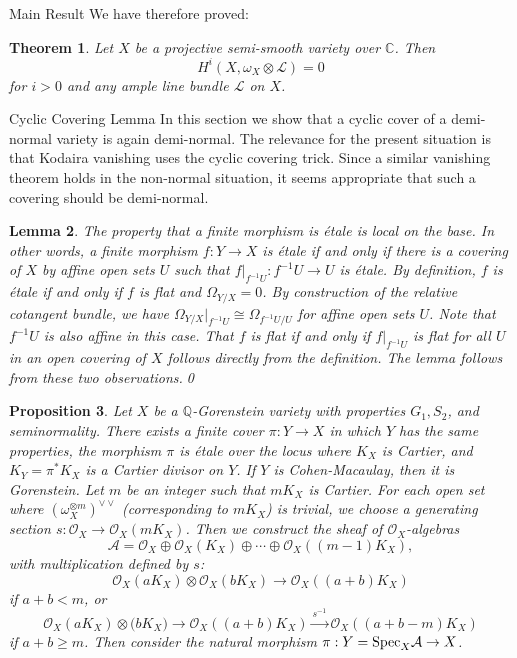 \documentclass{article}
\newtheorem{theorem}{Theorem}[section]
\newtheorem{proposition}[theorem]{Proposition}
\newtheorem{lemma}[theorem]{Lemma}
\begin{document}
\begin{section}{Main Result}
We have therefore proved:

\begin{theorem}  Let $X$ be a projective semi-smooth variety over $\mathbb{C}$.  Then $$H^i(X, \omega_X \otimes \mathcal{L}) = 0$$ for $i>0$ and any ample line bundle $\mathcal{L}$ on $X$.

\end{theorem}


\end{section}
\begin{section}{Cyclic Covering Lemma}  In this section we show that a cyclic cover of a demi-normal variety is again demi-normal.  The relevance for the present situation is that Kodaira vanishing uses the cyclic covering trick.  Since a similar vanishing theorem holds in the non-normal situation, it seems appropriate that such a covering should be demi-normal.


\begin{lemma}  The property that a finite morphism is \'etale is local on the base.  In other words, a finite morphism $f: Y \rightarrow X$ is \'etale if and only if there is a covering of $X$ by affine open sets $U$ such that $f|_{f^{-1}U}: f^{-1}U \rightarrow U$ is \'etale.
\proof  By definition, $f$ is \'etale if and only if $f$ is flat and $\Omega_{Y/X} = 0$.  By construction of the relative cotangent bundle, we have $\Omega_{Y/X}|_{f^{-1}U} \cong \Omega_{f^{-1}U/U}$ for affine open sets $U$.  Note that $f^{-1}U$ is also affine in this case.  That $f$ is flat if and only if $f|_{f^{-1}U}$ is flat for all $U$ in an open covering of $X$ follows directly from the definition.  The lemma follows from these two observations.\qed
\end{lemma}

\begin{proposition}  Let $X$ be a $\mathbb{Q}$-Gorenstein variety with properties $G_1, S_2$, and seminormality.  There exists a finite cover $\pi: Y \rightarrow X$ in which $Y$ has the same properties, the morphism $\pi$ is \'etale over the locus where $K_X$ is Cartier, and $K_Y = \pi^*K_X$ is a Cartier divisor on $Y$.  If $Y$ is Cohen-Macaulay, then it is Gorenstein.
\proof  Let $m$ be an integer such that $mK_X$ is Cartier.  For each open set where $(\omega_X^{\otimes m})^{\vee\vee}$ (corresponding to $mK_X$) is trivial, we choose a generating section $s : \mathcal{O}_X \rightarrow \mathcal{O}_X(mK_X)$.  Then we construct the sheaf of $\mathcal{O}_X$-algebras $$\mathcal{A} = \mathcal{O}_X \oplus \mathcal{O}_X(K_X) \oplus \cdots \oplus \mathcal{O}_X((m-1)K_X),$$ with multiplication defined by $s$:  $$\mathcal{O}_X(aK_X) \otimes \mathcal{O}_X(bK_X) \rightarrow \mathcal{O}_X((a+b)K_X)$$ if $a+b <m$, or $$\mathcal{O}_X(aK_X) \otimes \mathcal(bK_X) \rightarrow \mathcal{O}_X((a+b)K_X) \stackrel{s^{-1}}{\rightarrow} \mathcal{O}_X((a+b-m)K_X)$$ if $a+b \geq m$.  Then consider the natural morphism $\pi: Y = \textbf{\textnormal{Spec}}_X \mathcal{A} \rightarrow X$.  


\end{proposition}
\end{section}
\end{document}
